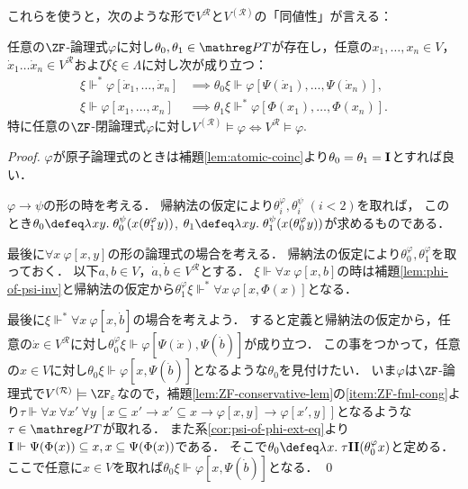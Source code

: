 \documentclass[realisability.tex]{subfiles}
\begin{document}
これらを使うと，次のような形で$V^{\mathcal{R}}$と$V^{(\mathcal{R})}$の「同値性」が言える：
\begin{theorem}
 任意の$\ZF$-論理式$\varphi$に対し$\theta_0, \theta_1 \in \PT$が存在し，任意の$x_1, \dots, x_n \in V$，$\dot{x}_1 \dots \dot{x}_n \in V^{\mathcal{R}}$および$\xi \in \Lambda$に対し次が成り立つ：
 \begin{align*}
  \xi \Vdash^* \varphi[\dot{x}_1, \dots, \dot{x}_n] &\implies \theta_0 \xi \Vdash \varphi[\Psi(\dot{x}_1), \dots, \Psi(\dot{x}_n)],\\
  \xi \Vdash \varphi[x_1, \dots, x_n] &\implies \theta_1 \xi \Vdash^* \varphi[\Phi(x_1), \dots, \Phi(x_n)].
 \end{align*}
 特に任意の$\ZF$-閉論理式$\varphi$に対し$V^{(\mathcal{R})} \models \varphi \iff V^{\mathcal{R}} \models \varphi$.
\end{theorem}
\begin{proof}
 $\varphi$が原子論理式のときは補題\ref{lem:atomic-coinc}より$\theta_0 = \theta_1 = \mathsf{\mathbf{I}}$とすれば良い．

 $\varphi \to \psi$の形の時を考える．
 帰納法の仮定により$\theta^\varphi_i, \theta^\psi_i\;(i < 2)$を取れば，
 このとき$\theta_0 \defeq \abs{xy}{\theta^\psi_0(x(\theta^\varphi_1 y))}$, $\theta_1 \defeq \abs{xy}{\theta^\psi_1(x(\theta^\varphi_0 y))}$が求めるものである．

 最後に$\forall x \: \varphi[x, y]$の形の論理式の場合を考える．
 帰納法の仮定により$\theta^\varphi_0, \theta^\varphi_1$を取っておく．
 以下$a,b \in V$，$\dot{a}, \dot{b} \in V^{\mathcal{R}}$とする．
 $\xi \Vdash \forall x \: \varphi[x, b]$の時は補題\ref{lem:phi-of-psi-inv}と帰納法の仮定から$\theta^\varphi_1 \xi \Vdash^* \forall x \: \varphi[x, \Phi(x)]$となる．

 最後に$\xi \Vdash^* \forall x \: \varphi[x, \dot{b}]$の場合を考えよう．
 すると定義と帰納法の仮定から，任意の$\dot{x} \in V^{\mathcal{R}}$に対し$\theta^\varphi_0 \xi \Vdash \varphi[\Psi(\dot{x}), \Psi(\dot{b})]$が成り立つ．
 この事をつかって，任意の$x \in V$に対し$\theta_0 \xi \Vdash \varphi[x, \Psi(\dot{b})]$となるような$\theta_0$を見付けたい．
 いま$\varphi$は$\ZF$-論理式で$V^{(\mathcal{R})} \models \ZFe$なので，補題\ref{lem:ZF-conservative-lem}の\ref{item:ZF-fml-cong}より$\tau \Vdash \forall x \: \forall x'\: \forall y \: [x \subseteq x' \to x' \subseteq x \to \varphi[x, y] \to \varphi[x', y]]$となるような$\tau \in \PT$が取れる．
 また系\ref{cor:psi-of-phi-ext-eq}より$\mathsf{\mathbf{I}} \Vdash \Psi(\Phi(x)) \subseteq x, x \subseteq \Psi(\Phi(x))$である．
 そこで$\theta_0 \defeq \abs{x}{\tau\I\I(\theta^\varphi_0 x)}$と定める．
 ここで任意に$x \in V$を取れば$\theta_0 \xi \Vdash \varphi[x, \Psi(\dot{b})]$となる． \qed
\end{proof}
\end{document}
